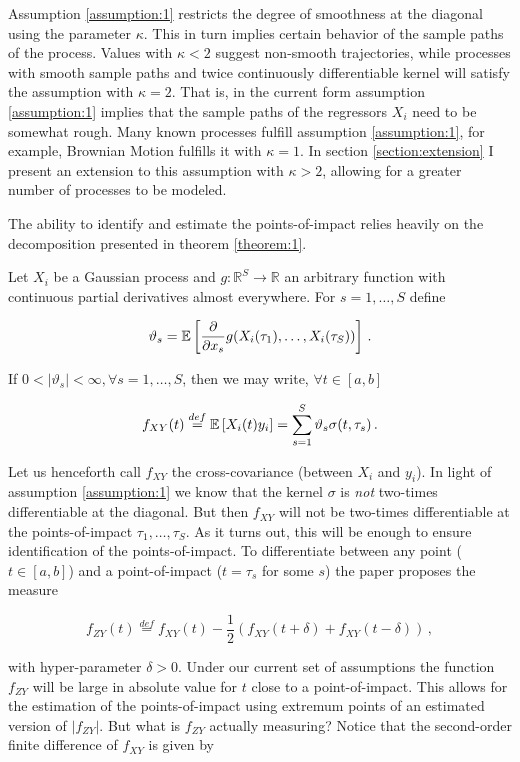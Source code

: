 Assumption \ref{assumption:1} restricts the degree of smoothness at the diagonal using
the parameter $\kappa$. This in turn implies certain behavior of the sample paths of the
process. Values with $\kappa < 2$ suggest non-smooth trajectories, while processes with
smooth sample paths and twice continuously differentiable kernel will satisfy the
assumption with $\kappa = 2$. That is, in the current form assumption \ref{assumption:1}
implies that the sample paths of the regressors $X_i$ need to be somewhat rough. Many
known processes fulfill assumption \ref{assumption:1}, for example, Brownian Motion
fulfills it with $\kappa = 1$. In section \ref{section:extension} I present an extension
to this assumption with $\kappa > 2$, allowing for a greater number of processes to be
modeled.


The ability to identify and estimate the points-of-impact relies heavily on the
decomposition presented in theorem \ref{theorem:1}.


\begin{theorem}
Let $X_i$ be a Gaussian process and $g : \mathbb{R}^S \to \mathbb{R}$ an arbitrary
function with continuous partial derivatives almost everywhere. For $s=1,\dots,S$ define

\[
    \vartheta_s = \mathbb{E}\left[\frac{\partial}{\partial x_s} g(X_i(\tau_1), \dots,
    X_i(\tau_S))\right] \,.
\]

If $0 < \left| \vartheta_s \right| < \infty, \forall s=1,\dots,S$, then we may write,
$\forall t \in [a, b]$

\[
    f_{XY}(t) \stackrel{def}{=} \mathbb{E}\left[X_i(t) y_i\right] = \sum_{s=1}^S \vartheta_s
    \sigma(t, \tau_s) \,.
\]
\label{theorem:1}
\end{theorem}


Let us henceforth call $f_{XY}$ the cross-covariance (between $X_i$ and $y_i$). In light
of assumption \ref{assumption:1} we know that the kernel $\sigma$ is \emph{not}
two-times differentiable at the diagonal. But then $f_{XY}$ will not be two-times
differentiable at the points-of-impact $\tau_1, \dots, \tau_S$. As it turns out, this
will be enough to ensure identification of the points-of-impact. To differentiate
between any point ($t \in [a, b]$) and a point-of-impact ($t = \tau_s$ for some $s$) the
paper proposes the measure

\[
    f_{ZY}(t) \stackrel{def}{=} f_{XY}(t) - \frac{1}{2} \left( f_{XY}(t + \delta) +
    f_{XY}(t - \delta) \right) \,,
\]

with hyper-parameter $\delta > 0$. Under our current set of assumptions the function
$f_{ZY}$ will be large in absolute value for $t$ close to a point-of-impact. This allows
for the estimation of the points-of-impact using extremum points of an estimated version
of $|f_{ZY}|$. But what is $f_{ZY}$ actually measuring? Notice that the second-order
finite difference of $f_{XY}$ is given by

